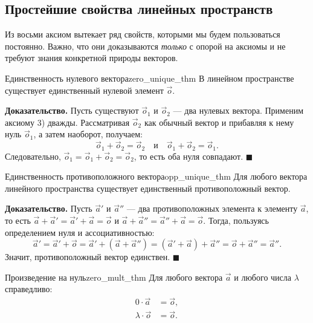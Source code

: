 \documentclass[12pt,a4paper]{article}
\newenvironment{myproof}{\noindent\textbf{Доказательство.}}{\hfill$\blacksquare$}
\begin{document}
\subsection{Простейшие свойства линейных пространств}

Из восьми аксиом вытекает ряд свойств, которыми мы будем пользоваться
постоянно. Важно, что они доказываются \emph{только} с опорой на
аксиомы и не требуют знания конкретной природы векторов.

\begin{theorem}{Единственность нулевого вектора}{zero_unique_thm}
В линейном пространстве существует единственный нулевой элемент
$\vec{o}$.
\end{theorem}

\begin{myproof}
Пусть существуют $\vec{o}_1$ и $\vec{o}_2$ — два нулевых вектора.
Применим аксиому 3) дважды. Рассматривая $\vec{o}_2$ как обычный
вектор и прибавляя к нему нуль $\vec{o}_1$, а затем наоборот,
получаем:
\[
\vec{o}_1 + \vec{o}_2 = \vec{o}_2
\quad \text{и} \quad
\vec{o}_1 + \vec{o}_2 = \vec{o}_1.
\]
Следовательно, $\vec{o}_1 = \vec{o}_1 + \vec{o}_2 = \vec{o}_2$, то
есть оба нуля совпадают.
\end{myproof}

\begin{theorem}{Единственность противоположного вектора}{opp_unique_thm}
Для любого вектора линейного пространства существует единственный
противоположный вектор.
\end{theorem}

\begin{myproof}
Пусть $\vec{a}'$ и $\vec{a}''$ — два противоположных элемента к
элементу $\vec{a}$, то есть
$\vec{a} + \vec{a}' = \vec{a}' + \vec{a} = \vec{o}$ и
$\vec{a} + \vec{a}'' = \vec{a}'' + \vec{a} = \vec{o}$. Тогда,
пользуясь определением нуля и ассоциативностью:
\[
\vec{a}' = \vec{a}' + \vec{o} = \vec{a}' + (\vec{a} + \vec{a}'')
= (\vec{a}' + \vec{a}) + \vec{a}'' = \vec{o} + \vec{a}'' = \vec{a}''.
\]
Значит, противоположный вектор единствен.
\end{myproof}

\begin{theorem}{Произведение на нуль}{zero_mult_thm}
Для любого вектора $\vec{a}$ и любого числа $\lambda$ справедливо:
\begin{align}
0 \cdot \vec{a} &= \vec{o}, \label{eq:zeroa} \\
\lambda \cdot \vec{o} &= \vec{o}. \label{eq:lzero}
\end{align}
\end{theorem}
\end{document}
